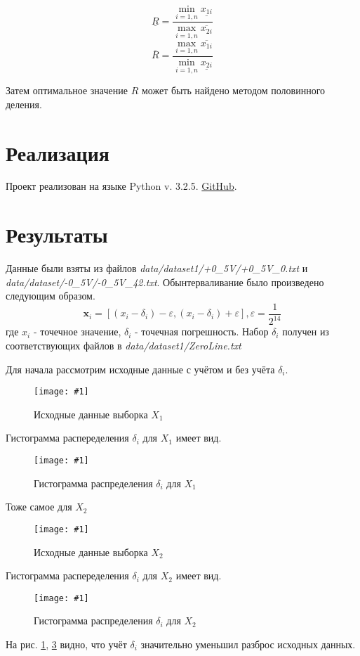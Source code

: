 \documentclass[a4paper,12pt]{article}
\newcommand{\plot}[3]{
    \begin{figure}[H]
        \begin{center}
            \texttt{[image: \#1]}
            \caption{#2}
            \label{#3}
        \end{center}
    \end{figure}
}
\begin{document}
    \begin{equation}
        \underline{R} = \frac{\min_{i=1,n}\underline{x_{1i}}}{\max_{i=1,n}\overline{x_{2i}}}
        \label{e:outerRMin}
    \end{equation}
    \begin{equation}
        \overline{R} = \frac{\max_{i=1,n}\overline{x_{1i}}}{\min_{i=1,n}\underline{x_{2i}}}
        \label{e:outerRMax}
    \end{equation}

    Затем оптимальное значение $ R $ может быть найдено методом половинного деления.

    \section{Реализация}
    \quad Проект реализован на языке Python v. 3.2.5.
    \href{https://github.com/HellInsider/Intervals_2}{GitHub}.

    \section{Результаты}
    \quad Данные были взяты из файлов \textsl{data/dataset1/+0\_5V/+0\_5V\_0.txt} и \textsl{data/dataset/-0\_5V/-0\_5V\_42.txt}.
    Обынтерваливание было произведено следующим образом.
    \begin{equation}
        \textbf{x}_i = [(x_i - \delta_i) - \varepsilon, (x_i - \delta_i) + \varepsilon], \varepsilon = \frac{1}{2^{14}}
    \end{equation}
    где $ x_i $ - точечное значение, $ \delta_i $ - точечная погрешность.
    Набор $ \delta_i $ получен из соответствующих файлов в \textsl{data/dataset1/ZeroLine.txt}

    Для начала рассмотрим исходные данные с учётом и без учёта $ \delta_i $.
    \plot{FixedDataX1}{Исходные данные выборка $ X_1 $}{p:rawSampleX1}
    Гистограмма распеределения $ \delta_i $ для $ X_1 $ имеет вид.
    \plot{DeltasHistX1}{Гистограмма распределения $ \delta_i $ для $ X_1 $}{p:deltasHistX1}

    Тоже самое для $ X_2 $
    \plot{FixedDataX2}{Исходные данные выборка $ X_2 $}{p:rawSampleX2}
    Гистограмма распеределения $ \delta_i $ для $ X_2 $ имеет вид.
    \plot{DeltasHistX2}{Гистограмма распределения $ \delta_i $ для $ X_2 $}{p:deltasHistX2}

    На рис. \ref{p:rawSampleX1}, \ref{p:rawSampleX2} видно, что учёт $ \delta_i $ значительно
    уменьшил разброс исходных данных.
    
\end{document}
